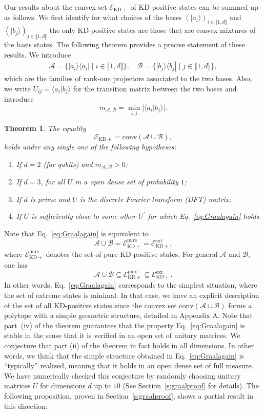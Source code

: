 \documentclass[a4paper, notitlepage, 11pt]{article}
\numberwithin{equation}{section}
\newcommand{\cket}[1]{|#1\rangle}
\newcommand{\Acal}{{\mathcal A}}
\newcommand{\Bcal}{{\mathcal B}}
\newcommand{\EcalKDC}{{\mathcal E}_{\mathrm{KD+}}}
\newcommand{\EcalKDCpu}{{\mathcal E}_{\mathrm{KD+}}^{\mathrm{pure}}}
\newcommand{\EcalKDCext}{{\mathcal E}_{\mathrm{KD+}}^{\mathrm{ext}}}
\newcommand{\mab}{m_{\Acal,\Bcal}}
\newcommand{\conv}[1]{\mathrm{conv}\left(#1\right)}
\newcommand{\IntEnt}[2]{\llbracket #1 , #2 \rrbracket}
\newcommand{\convAB}{\conv{\Acal \cup \Bcal}}
\newtheorem{Theorem}{Theorem}[section]
\begin{document}
 Our results {about the convex set $\EcalKDC$ of KD-positive states} can be summed up as follows. We first identify for what choices of the bases $ \left(\cket{a_i}\right)_{i\in\IntEnt{1}{d}}$ and $\left(\cket{b_j}\right)_{j\in\IntEnt{1}{d}}$ the only  KD-positive states are those that are convex mixtures of the basis states. The following theorem provides a precise statement of these results.  We introduce 
\begin{eqnarray*}
    \Acal=\{ |a_i\rangle\langle a_i|\mid i\in\IntEnt{1}{d}\},\quad
    \Bcal=\{ |b_j\rangle\langle b_j|\mid j\in\IntEnt{1}{d}\} ,
\end{eqnarray*}
which are the families of rank-one projectors associated to the two bases. Also, we write $U_{ij}=\langle a_i|b_j\rangle$ for the transition matrix between the two bases and introduce
$$
\mab=\min_{i,j}|\langle a_i|b_j\rangle|.
$$
\begin{Theorem}
\label{thm:Graal}
The equality
\begin{equation}\label{eq:Graalagain}
\EcalKDC=\convAB,
\end{equation}
holds under any single one of the following hypotheses:
\begin{enumerate}[label=(\roman*),wide, labelindent=0pt]
    \item If $d=2$ (for qubits) and $\mab>0$;
    \item If $d=3$, for all $U$ in a open dense set of probability $1$;
    \item If $d$ is prime and $U$ is the discrete Fourier transform (DFT) matrix;
    \item If $U$ is sufficiently close to some other $U^{\prime}$ for which Eq.~\eqref{eq:Graalagain} holds.
\end{enumerate}
\end{Theorem}
Note that Eq.~\eqref{eq:Graalagain} is equivalent to
\begin{equation}\label{eq:Graaltris}
\Acal\cup\Bcal=\EcalKDCpu=\EcalKDCext,
\end{equation} 
where  $\EcalKDCpu$ denotes the set of pure KD-positive states.  
For general $\Acal$ and $\Bcal$, one has
\begin{equation}\label{eq:pureinext}
\Acal\cup\Bcal\subseteq \EcalKDCpu\subseteq \EcalKDCext.
\end{equation}
In other words, Eq.~\eqref{eq:Graalagain} corresponds to the simplest situation, where the set of extreme states is minimal.  In that case, we have  {an} explicit description of the set of all KD-positive states since the convex set $\convAB $ forms a  polytope with a simple geometric structure, detailed in Appendix A.  Note that part~(iv) of the theorem guarantees that the property Eq.~\eqref{eq:Graalagain} is stable in the sense that it is verified in an open set of unitary matrices. We conjecture that part (ii) of the theorem in fact holds in all dimensions. In other words, we think that the simple structure obtained in Eq.~\eqref{eq:Graalagain} is ``typically'' realized, meaning that it holds in an open dense set of full measure. We have numerically checked this  conjecture by randomly choosing unitary matrices $U$ for dimensions $d$ up to $10$ (See Section~\ref{s:graalproof} for details). The following proposition, proven in Section~\ref{s:graalproof}, shows a partial result in this direction:
\end{document}
